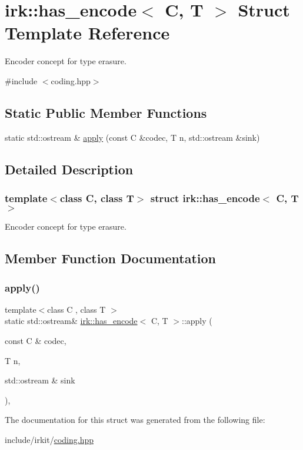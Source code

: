 \hypertarget{structirk_1_1has__encode}{}\section{irk\+:\+:has\+\_\+encode$<$ C, T $>$ Struct Template Reference}
\label{structirk_1_1has__encode}


Encoder concept for type erasure.  




{\ttfamily \#include $<$coding.\+hpp$>$}

\subsection*{Static Public Member Functions}
\begin{DoxyCompactItemize}
\item 
static std\+::ostream \& \mbox{\hyperlink{structirk_1_1has__encode_a70a6ec54106078d6ae70260f520af854}{apply}} (const C \&codec, T n, std\+::ostream \&sink)
\end{DoxyCompactItemize}


\subsection{Detailed Description}
\subsubsection*{template$<$class C, class T$>$\newline
struct irk\+::has\+\_\+encode$<$ C, T $>$}

Encoder concept for type erasure. 

\subsection{Member Function Documentation}
\mbox{\label{structirk_1_1has__encode_a70a6ec54106078d6ae70260f520af854}} 
\subsubsection{\texorpdfstring{apply()}{apply()}}
{\footnotesize\ttfamily template$<$class C , class T $>$ \\
static std\+::ostream\& \mbox{\hyperlink{structirk_1_1has__encode}{irk\+::has\+\_\+encode}}$<$ C, T $>$\+::apply (\begin{DoxyParamCaption}\item[{const C \&}]{codec,  }\item[{T}]{n,  }\item[{std\+::ostream \&}]{sink }\end{DoxyParamCaption})\hspace{0.3cm}{\ttfamily [inline]}, {\ttfamily [static]}}



The documentation for this struct was generated from the following file\+:\begin{DoxyCompactItemize}
\item 
include/irkit/\mbox{\hyperlink{coding_8hpp}{coding.\+hpp}}\end{DoxyCompactItemize}
